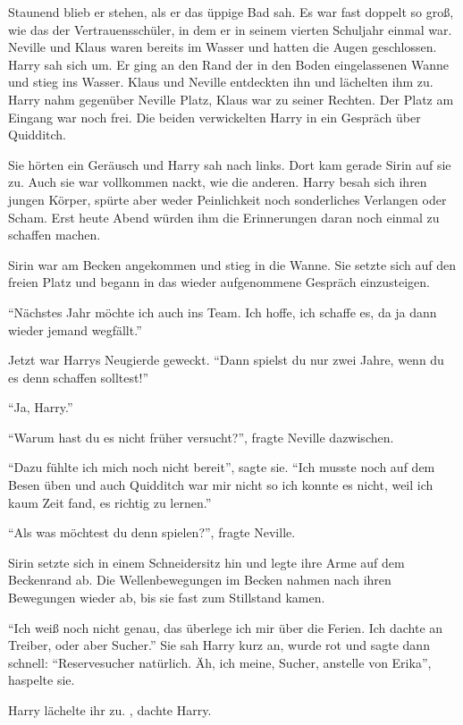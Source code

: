 Staunend blieb er stehen, als er das üppige Bad sah. Es war fast doppelt so groß, wie das der Vertrauensschüler, in dem er in seinem vierten Schuljahr einmal war. Neville und Klaus waren bereits im Wasser und hatten die Augen geschlossen. Harry sah sich um. Er ging an den Rand der in den Boden eingelassenen Wanne und stieg ins Wasser. Klaus und Neville entdeckten ihn und lächelten ihm zu. Harry nahm gegenüber Neville Platz, Klaus war zu seiner Rechten. Der Platz am Eingang war noch frei. Die beiden verwickelten Harry in ein Gespräch über Quidditch.

Sie hörten ein Geräusch und Harry sah nach links. Dort kam gerade Sirin auf sie zu. Auch sie war vollkommen nackt, wie die anderen. Harry besah sich ihren jungen Körper, spürte aber weder Peinlichkeit noch sonderliches Verlangen oder Scham. Erst heute Abend würden ihm die Erinnerungen daran noch einmal zu schaffen machen.

Sirin war am Becken angekommen und stieg in die Wanne. Sie setzte sich auf den freien Platz und begann in das wieder aufgenommene Gespräch einzusteigen.

\enquote{Nächstes Jahr möchte ich auch ins Team. Ich hoffe, ich schaffe es, da ja dann wieder jemand wegfällt.}

Jetzt war Harrys Neugierde geweckt. \enquote{Dann spielst du nur zwei Jahre, wenn du es denn schaffen solltest!}

\enquote{Ja, Harry.}

\enquote{Warum hast du es nicht früher versucht?}, fragte Neville dazwischen.

\enquote{Dazu fühlte ich mich noch nicht bereit}, sagte sie. \enquote{Ich musste noch auf dem Besen üben und auch Quidditch war mir nicht so \gst ich konnte es nicht, weil ich kaum Zeit fand, es richtig zu lernen.}

\enquote{Als was möchtest du denn spielen?}, fragte Neville.

Sirin setzte sich in einem Schneidersitz hin und legte ihre Arme auf dem Beckenrand ab. Die Wellenbewegungen im Becken nahmen nach ihren Bewegungen wieder ab, bis sie fast zum Stillstand kamen.

\enquote{Ich weiß noch nicht genau, das überlege ich mir über die Ferien. Ich dachte an Treiber, oder aber Sucher.} Sie sah Harry kurz an, wurde rot und sagte dann schnell: \enquote{Reservesucher natürlich. Äh, ich meine, Sucher, anstelle von Erika}, haspelte sie.

Harry lächelte ihr zu. , dachte Harry.

